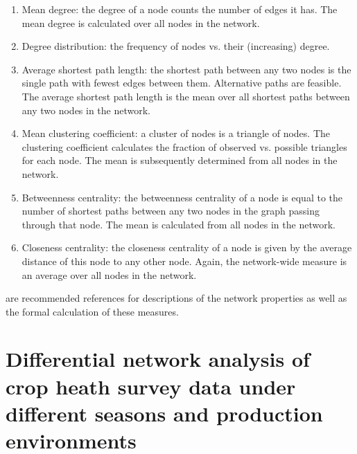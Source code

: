 \begin{enumerate}
\item Mean degree: the degree of a node counts the number of edges it has. The mean degree is calculated over all nodes in the network.
\item Degree distribution: the frequency of nodes vs. their (increasing) degree.
\item Average shortest path length: the shortest path between any two nodes is the single path with fewest edges between them. Alternative paths are feasible. The average shortest path length is the mean over all shortest paths between any two nodes in the network.
\item Mean clustering coefficient: a cluster of nodes is a triangle of nodes. The clustering coefficient calculates the fraction of observed vs. possible triangles for each node. The mean is subsequently determined from all nodes in the network.
\item Betweenness centrality: the betweenness centrality of a node is equal to the number of shortest paths between any two nodes in the graph passing through that node. The mean is calculated from all nodes in the network.
\item Closeness centrality: the closeness centrality of a node is given by the average distance of this node to any other node. Again, the network-wide measure is an average over all nodes in the network.
\end{enumerate}

 are recommended references for descriptions of the network properties as well as the formal calculation of these measures.

\section*{Differential network analysis of crop heath survey data under different seasons and production environments}



